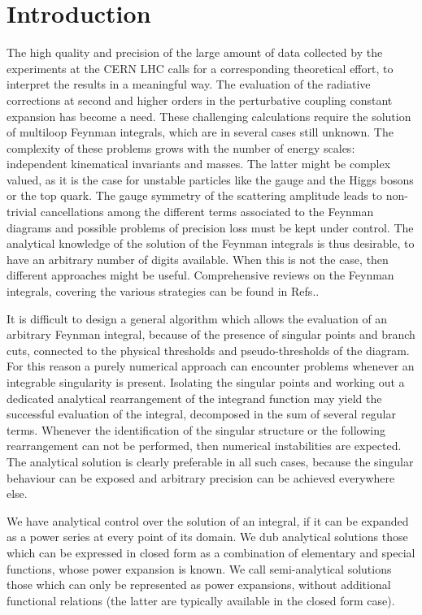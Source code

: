 \section{Introduction}
\label{sec:intro}

The high quality and precision of the large amount of data collected by the experiments at the CERN LHC calls for a corresponding theoretical effort, to interpret the results in a meaningful way.
The evaluation of the radiative corrections at second and higher orders in the perturbative coupling constant expansion has become a need.
These challenging calculations require the solution of multiloop Feynman integrals, which are in several cases still unknown.
The complexity of these problems grows with the number of energy scales: independent kinematical invariants and masses. The latter might be complex valued, as it is the case for unstable particles like the gauge and the Higgs bosons or the top quark.
The gauge symmetry of the scattering amplitude leads to non-trivial cancellations among the different terms associated to the Feynman diagrams and possible problems of precision loss must be kept under control. The analytical knowledge of the solution of the Feynman integrals is thus desirable, to have an arbitrary number of digits available. When this is not the case, then different approaches might be useful.
Comprehensive reviews on the Feynman integrals, covering the various strategies can be found in Refs.\cite{Heinrich:2020ybq,Weinzierl:2022eaz,Bourjaily:2022bwx,Blumlein:2022zkr}.



It is difficult to design  a general algorithm which allows the evaluation of an arbitrary Feynman integral, because of the presence of singular points and branch cuts, connected to the physical thresholds and pseudo-thresholds of the diagram. For this reason a purely numerical approach \cite{Smirnov:2015mct,Borowka:2017idc} can encounter problems whenever an integrable singularity is present. Isolating the singular points and working out a dedicated analytical rearrangement of the integrand function may yield the successful evaluation of the integral, decomposed in the sum of several regular terms.
Whenever the identification of the singular structure or the following rearrangement can not be performed, then numerical instabilities are expected. The analytical solution is clearly preferable in all such cases, because the singular behaviour can be exposed and arbitrary precision can be achieved everywhere else.

We have analytical control over the solution of an integral, if it can be expanded as a power series at every point of its domain.
We dub analytical solutions those which can be expressed in closed form as a combination of elementary and special functions, whose power expansion is known. We call semi-analytical solutions those which can only be represented as power expansions, without additional functional relations (the latter are typically available in the closed form case).

